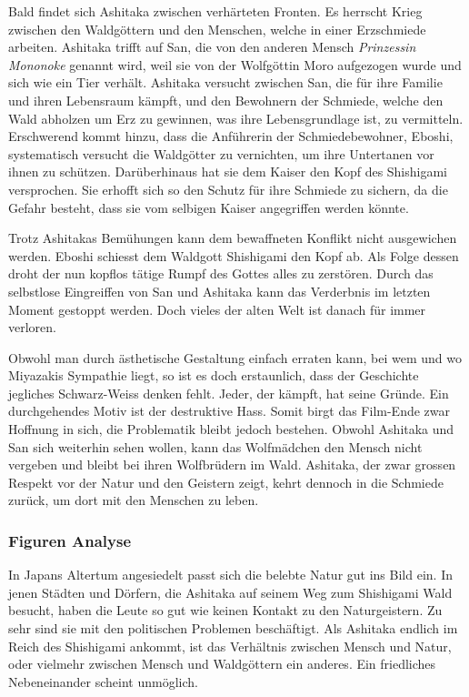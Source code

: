 Bald findet sich Ashitaka zwischen verhärteten Fronten. Es herrscht Krieg zwischen den Waldgöttern und den Menschen, welche in einer Erzschmiede arbeiten. Ashitaka trifft auf San, die von den anderen Mensch \emph{Prinzessin Mononoke} genannt wird, weil sie von der Wolfgöttin Moro aufgezogen wurde und sich wie ein Tier verhält. Ashitaka versucht zwischen San, die für ihre Familie und ihren Lebensraum kämpft, und den Bewohnern der Schmiede, welche den Wald abholzen um Erz zu gewinnen, was ihre Lebensgrundlage ist, zu vermitteln. Erschwerend kommt hinzu, dass die Anführerin der Schmiedebewohner, Eboshi, systematisch versucht die Waldgötter zu vernichten, um ihre Untertanen vor ihnen zu schützen. Darüberhinaus hat sie dem Kaiser den Kopf des Shishigami versprochen. Sie erhofft sich so den Schutz für ihre Schmiede zu sichern, da die Gefahr besteht, dass sie vom selbigen Kaiser angegriffen werden könnte. 

Trotz Ashitakas Bemühungen kann dem bewaffneten Konflikt nicht ausgewichen werden. Eboshi schiesst dem Waldgott Shishigami den Kopf ab. Als Folge dessen droht der nun kopflos tätige Rumpf des Gottes alles zu zerstören. Durch das selbstlose Eingreiffen von San und Ashitaka kann das Verderbnis im letzten Moment gestoppt werden. Doch vieles der alten Welt ist danach für immer verloren.

Obwohl man durch ästhetische Gestaltung einfach erraten kann, bei wem und wo Miyazakis Sympathie liegt, so ist es doch erstaunlich, dass der Geschichte jegliches Schwarz-Weiss denken fehlt. Jeder, der kämpft, hat seine Gründe. Ein durchgehendes Motiv ist der destruktive Hass. Somit birgt das Film-Ende zwar Hoffnung in sich, die Problematik bleibt jedoch bestehen. 
Obwohl Ashitaka und San sich weiterhin sehen wollen, kann das Wolfmädchen den Mensch nicht vergeben und bleibt bei ihren Wolfbrüdern im Wald. Ashitaka, der zwar grossen Respekt vor der Natur und den Geistern zeigt, kehrt dennoch in die Schmiede zurück, um dort mit den Menschen zu leben.  

\subsubsection{Figuren Analyse}
In Japans Altertum angesiedelt passt sich die belebte Natur gut ins Bild ein. In jenen Städten und Dörfern, die Ashitaka auf seinem Weg zum Shishigami Wald besucht, haben die Leute so gut wie keinen Kontakt zu den Naturgeistern. Zu sehr sind sie mit den politischen Problemen beschäftigt. Als Ashitaka endlich im Reich des Shishigami ankommt, ist das Verhältnis zwischen Mensch und Natur, oder vielmehr zwischen Mensch und Waldgöttern ein anderes. Ein friedliches Nebeneinander scheint unmöglich. 

